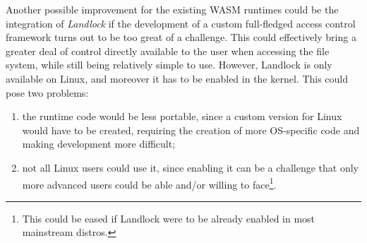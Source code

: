 Another possible improvement for the existing WASM runtimes could be the integration of \textit{Landlock}
if the development of a custom full-fledged access control framework turns out to be too great of
a challenge.
This could effectively bring a greater deal of control directly available to the user when
accessing the file system, while still being relatively simple to use.
However, Landlock is only available on Linux, and moreover it has to be enabled in the kernel.
This could pose two problems:
\begin{enumerate}
  \item the runtime code would be less portable, since a custom version for Linux would have to be created, requiring
        the creation of more OS-specific code and making development more difficult;
  \item not all Linux users could use it, since enabling it can be a challenge that only more advanced users
        could be able and/or willing to face\footnote{This could be eased if Landlock were to be already enabled in most mainstream distros.}.
\end{enumerate}
